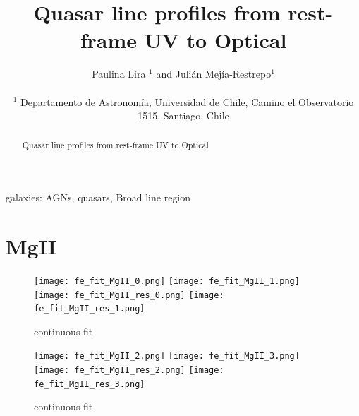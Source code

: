 \documentclass[usenatbib]{mn2e}
\begin{document}
\title[Quasar line profiles from  rest-frame UV to Optical]{Quasar line profiles from rest-frame UV to Optical}    
\author[P. Lira and J.E. Mejia-Restrepo]{
\parbox[t]{\textwidth}{\raggedright 
Paulina Lira $^{1}$ and
Juli\'an Mej\'ia-Restrepo$^{1}$ 
}
\vspace*{6pt}\\
$^{1}$ Departamento de Astronom\'{i}a, Universidad de Chile, Camino el
Observatorio 1515, Santiago, Chile} 

\maketitle

\begin{abstract}
 Quasar line profiles from  rest-frame UV to Optical 
\end{abstract}

\begin{keywords}
{galaxies: AGNs, quasars, Broad line region} 
\end{keywords}


\section{MgII}


\begin{figure}
\begin{center}
\texttt{[image: fe\_fit\_MgII\_0.png]}
\vspace{5mm}
\texttt{[image: fe\_fit\_MgII\_1.png]}\\
\texttt{[image: fe\_fit\_MgII\_res\_0.png]}
\hspace{5mm}
\texttt{[image: fe\_fit\_MgII\_res\_1.png]}\\
\end{center} 
\caption{continuous fit \label{fig:landscape}}   
\end{figure}

\newpage

\begin{figure}
\begin{center}
\texttt{[image: fe\_fit\_MgII\_2.png]}
\vspace{5mm}
\texttt{[image: fe\_fit\_MgII\_3.png]}\\
\texttt{[image: fe\_fit\_MgII\_res\_2.png]}
\hspace{5mm}
\texttt{[image: fe\_fit\_MgII\_res\_3.png]}\\
\end{center} 
\caption{continuous fit \label{fig:landscape}}   
\end{figure}
\end{document}
